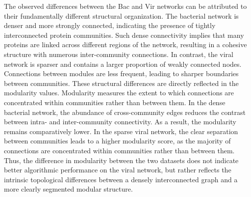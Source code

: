 The observed differences between the Bac and Vir networks can be attributed to their fundamentally
different structural organization. The bacterial network is denser and more strongly connected,
indicating the presence of tightly interconnected protein communities.
Such dense connectivity implies that many proteins are linked across different regions of
the network, resulting in a cohesive structure with numerous inter-community connections.
In contrast, the viral network is sparser and contains a larger proportion of weakly
connected nodes. Connections between modules are less frequent, leading to sharper boundaries
between communities.
These structural differences are directly reflected in the modularity values. Modularity
measures the extent to which connections are concentrated within communities rather than 
between them.
In the dense bacterial network, the abundance of cross-community edges reduces
the contrast between intra- and inter-community connectivity. As a result, the modularity 
remains comparatively lower.
In the sparse viral network, the clear separation between communities leads to a higher modularity score,
as the majority of connections are concentrated within communities rather than between them.
Thus, the difference in modularity between the two datasets does not indicate better algorithmic 
performance on the viral network, but rather reflects the intrinsic topological differences between 
a densely interconnected graph and a more clearly segmented modular structure.




